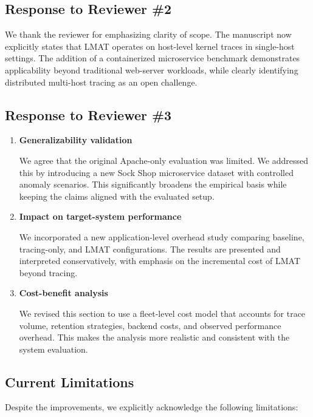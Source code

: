 \documentclass[11pt]{article}
\begin{document}
\subsection*{Response to Reviewer \#2}

We thank the reviewer for emphasizing clarity of scope. The manuscript now explicitly states that LMAT operates on host-level kernel traces in single-host settings. The addition of a containerized microservice benchmark demonstrates applicability beyond traditional web-server workloads, while clearly identifying distributed multi-host tracing as an open challenge.

\subsection*{Response to Reviewer \#3}

\begin{enumerate}[leftmargin=1.5em, itemsep=0.6em]
\item \textbf{Generalizability validation}

We agree that the original Apache-only evaluation was limited. We addressed this by introducing a new Sock Shop microservice dataset with controlled anomaly scenarios. This significantly broadens the empirical basis while keeping the claims aligned with the evaluated setup.

\item \textbf{Impact on target-system performance}

We incorporated a new application-level overhead study comparing baseline, tracing-only, and LMAT configurations. The results are presented and interpreted conservatively, with emphasis on the incremental cost of LMAT beyond tracing.

\item \textbf{Cost-benefit analysis}

We revised this section to use a fleet-level cost model that accounts for trace volume, retention strategies, backend costs, and observed performance overhead. This makes the analysis more realistic and consistent with the system evaluation.
\end{enumerate}

\subsection*{Current Limitations}

Despite the improvements, we explicitly acknowledge the following limitations:
\end{document}
